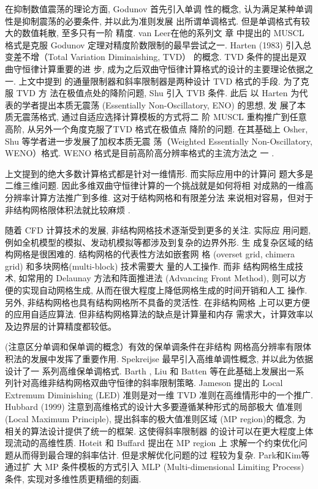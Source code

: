 在抑制数值震荡的理论方面, Godunov \cite{Godunov1959} 首先引入单调
性的概念, 认为满足某种单调性是抑制震荡的必要条件, 并以此为准则发展
出所谓单调格式. 但是单调格式有较大的数值耗散, 至多只有一阶
精度. van Leer在他的系列文
章\cite{Leer1973,VANLEER1974361,VanLeer1977263,Leer1977,Leer1979}
中提出的 MUSCL 格式是克服 Godunov 定理对精度阶数限制的最早尝试之一.
Harten (1983)\cite{Harten1983} 引入总变差不增（Total Variation
Diminaishing, TVD） 的概念. TVD 条件的提出是双曲守恒律计算重要的进
步, 成为之后双曲守恒律计算格式的设计的主要理论依据之一. 上文中提到
的通量限制器和斜率限制器是两种设计 TVD 格式的手段. 为了克服 TVD 方
法在极值点处的降阶问题, Shu \cite{Shu1987} 引入 TVB 条件. 此后
以 Harten 为代表的学者\cite{Harten1987231}提出本质无震荡 (Essentially Non-Oscillatory, ENO) 的思想, 发
展了本质无震荡格式, 通过自适应选择计算模板的方式将二
阶 MUSCL 重构推广到任意高阶, 从另外一个角度克服了TVD 格式在极值点
降阶的问题. 在其基础上 Osher, Shu 等学者\cite{Liu1994200,Jiang1996}进一步发展了加权本质无震
荡（Weighted Essentially
Non-Oscillatory, WENO）格式. WENO 格式是目前高阶高分辨率格式的主流方法之
一 \cite{Wang2007}.


上文提到的绝大多数计算格式都是针对一维情形.  而实际应用中的计算问
题大多是二维三维问题. 因此多维双曲守恒律计算的一个挑战就是如何将相
对成熟的一维高分辨率计算方法推广到多维. 这对于结构网格和有限差分法
来说相对容易，但对于非结构网格限体积法就比较麻烦 \cite{Deng2012}.

随着 CFD 计算技术的发展, 非结构网格技术逐渐受到更多的关注. 实际应
用问题, 例如全机模型的模拟、发动机模拟等都涉及到复杂的边界外形. 生
成复杂区域的结构网格是很困难的. 结构网格的代表性方法如嵌套网
格 (overset grid, chimera grid) 和多块网格(multi-block) 技术需要大
量的人工操作\cite{Venkatakrishnan1996,overset1983,Vatsa1993}. 而非
结构网格生成技术, 如常用的 Delaunay 方法和阵面推进法 (Advancing
Front Method)\cite{Anderson199423,Blazek2001,Ldhner1988}, 则可以方
便的实现自动网格生成, 从而在很大程度上降低网格生成的时间开销和人工
操作. 另外, 非结构网格也具有结构网格所不具备的灵活性. 在非结构网格
上可以更方便的应用自适应算法. 但非结构网格算法的缺点是计算量和内存
需求大，计算效率以及边界层的计算精度都较低。

{(\color{red}注意区分单调和保单调的概念}）有效的保单调条件在非结构
网格高分辨率有限体积法的发展中发挥了重要作用. Spekreijse
\cite{spekreijse1987} 最早引入高维单调性概念, 并以此为依据设计了一
系列高维保单调格式. Barth \cite{Barth1989}, Liu
\cite{Liu1993} 和 Batten \cite{Batten1996} 等在此基础上发展出一系
列针对高维非结构网格双曲守恒律的斜率限制策略.
Jameson\cite{Jameson1995} 提出的 Local Extremum Diminishing (LED)
准则是对一维 TVD 准则在高维情形中的一个推广.  Hubbard (1999)
\cite{Hubbard1999}注意到高维格式的设计大多要遵循某种形式的局部极大
值准则 (Local Maximum Principle), 提出斜率的极大值准则区域 (MP
region)的概念, 为相关的算法设计提供了统一的框架. 这使得斜率限制器
的设计可以在更大程度上体现流动的高维性质. Hoteit
\cite{Hoteit2004}和 Buffard \cite{Buffard2010}提出在 MP region 上
求解一个约束优化问题从而得到最合理的斜率估计. 但是求解优化问题的过
程较为复杂.  Park和Kim等\cite{Park2010,Park2011,Park2014}通过扩
大 MP 条件模板的方式引入 MLP (Multi-dimensional Limiting Process)
条件, 实现对多维性质更精细的刻画.

